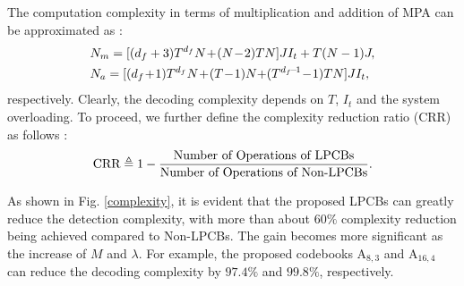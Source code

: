\documentclass[journal]{IEEEtran}
\begin{document}
 The computation complexity  in terms of multiplication  and addition of   MPA  can be approximated as \cite{yang2016low,bayesteh2015low}:
\begin{equation} 
\small
\begin{aligned}
&{N_{m}} = [({d_{f}} + 3){T^{d_{f}}}{N} \! + \! ({N} \!- \!2)T{N}]J{I_{t}} + T({N} - 1)J,\\ 
&{N_{a}} 
=[({d_{f}}\! + \!1){T^{d_{f}}}{N} \! +\!  (T \!- \!1){N}{\mathrm{ + (}}{T^{d_f \!- \! 1}} \!-\! 1)T{N}]J{I_{t}},  \\  \end{aligned}
\end{equation}
respectively. Clearly,  the decoding complexity depends on  $T$, $I_{t}$ and the system overloading.     To proceed, we further define the   complexity reduction ratio (CRR) as follows \cite{bao2017bit}:
 \begin{equation}
 \small
     \text{CRR} \triangleq 1- \frac{\text{Number of Operations of LPCBs}}{\text{Number of Operations of Non-LPCBs}}.
 \end{equation}
  
As shown in Fig. \ref{complexity}, it is evident that the proposed LPCBs can greatly reduce the detection complexity, with  more than about $60\%$ complexity reduction being achieved compared to Non-LPCBs.  
The gain becomes more significant  as the increase of $M$ and  $\lambda$.   For example, the proposed codebooks  $\text{A}_{8, 3}$ and $\text{A}_{16,4}$ can reduce the decoding complexity by $97.4\%$ and $99.8\%$, respectively.  
\end{document}
